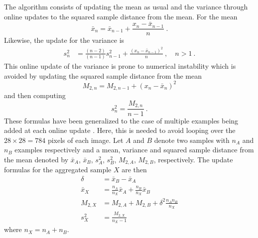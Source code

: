 The algorithm consists of updating the mean as usual and the variance through online updates to the squared sample distance from the mean. For the mean
\begin{equation}
    \bar{x}_n = \bar{x}_{n-1} + \frac{x_n-\bar{x}_{n-1}}{n} \ .
\end{equation}
Likewise, the update for the variance is
\begin{align*}
    s^2_n
    &= \frac{(n-2)}{(n-1)} s^2_{n-1} + \frac{(x_n - \bar{x}_{n-1})^2}{n} \ , \quad n>1 \ .
\end{align*}
This online update of the variance is prone to numerical instability which is avoided by updating the squared sample distance from the mean
\begin{equation*}
    M_{2,n} = M_{2,n-1} + (x_n - \bar{x}_{n})^2 %
\end{equation*}
and then computing 
\begin{equation*}
    s_n^2 = \frac{M_{2,n}}{n-1} \ .
\end{equation*}
These formulas have been generalized to the case of multiple examples being added at each online update \cite{Chan1979}. Here, this is needed to avoid looping over the $28\times28=784$ pixels of each image. Let $A$ and $B$ denote two samples with $n_A$ and $n_B$ examples respectively and a mean, variance and squared sample distance from the mean denoted by $\bar{x}_A$, $\bar{x}_B$, $s^2_A$, $s^2_B$, $M_{2,A}$, $M_{2,B}$, respectively. The update formulas for the aggregated sample $X$ are then
\begin{align*}
    \delta &= \bar{x}_B - \bar{x}_A\\
    \bar{x}_X &= \frac{n_A}{n_X}\bar{x}_A + \frac{n_B}{n_X}\bar{x}_B\\
    M_{2,X} &= M_{2,A} + M_{2,B} + \delta^2\frac{n_A n_B}{n_X}\\
    s_X^2 &= \frac{M_{2,X}}{n_X-1}
\end{align*}
where $n_X = n_A + n_B$.

